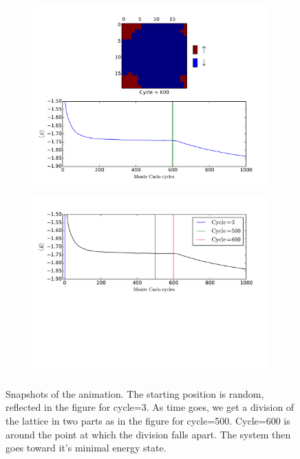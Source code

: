 \documentclass[twoside, 11pt]{article}
\begin{document}
\begin{figure}
\begin{subfigure}[b]{0.3\textwidth}
			        \includegraphics[scale = 0.6, clip=true, trim=210 220 155 0]{../Results/extra/extra_600.pdf}
			    \end{subfigure}
			    \begin{subfigure}[b]{\textwidth}
			    	\includegraphics[scale=0.7, clip=true, trim=0 200 0 0]{../Results/extra/extra_marked.pdf}
			    \end{subfigure}
			    \caption{Snapshots of the animation. The starting position is random, reflected in the figure for cycle=3. As time goes, we get a division of the lattice in two parts as in the figure for cycle=500. Cycle=600 is around the point at which the division falls apart. The system then goes toward it's minimal energy state.}
			    \label{fig: animation snapshots}
			\end{figure}
\end{document}
